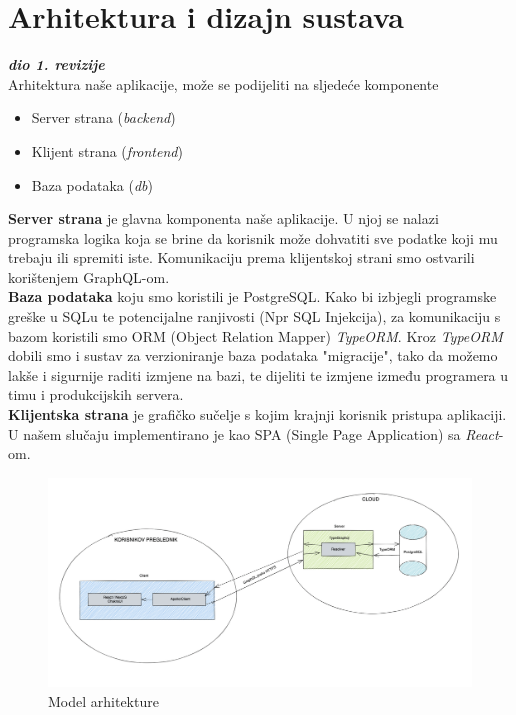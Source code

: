 \chapter{Arhitektura i dizajn sustava}
		
		\textbf{\textit{dio 1. revizije}}\\

		Arhitektura naše aplikacije, može se podijeliti na sljedeće komponente
	\begin{itemize}
		\item 	Server strana (\textit{backend})
		\item 	Klijent strana (\textit{frontend})
		\item 	Baza podataka (\textit{db})		
	\end{itemize}
	\textbf{Server strana} je glavna komponenta naše aplikacije. U njoj se nalazi programska logika koja se brine da korisnik može dohvatiti sve podatke koji mu trebaju ili spremiti iste. Komunikaciju prema klijentskoj strani smo ostvarili korištenjem GraphQL-om. \\
	\textbf{Baza podataka} koju smo koristili je PostgreSQL. Kako bi izbjegli programske greške u SQLu te potencijalne ranjivosti (Npr SQL Injekcija), za komunikaciju s bazom koristili smo ORM (Object Relation Mapper) \textit{TypeORM}. Kroz \textit{TypeORM} dobili smo i sustav za verzioniranje baza podataka "migracije", tako da možemo lakše i sigurnije raditi izmjene na bazi, te dijeliti te izmjene između programera u timu i produkcijskih servera. \\
	\textbf{Klijentska strana} je grafičko sučelje s kojim krajnji korisnik pristupa aplikaciji. U našem slučaju implementirano je kao SPA (Single Page Application) sa \textit{React}-om. \\
	
	\begin{figure}[H]
		\includegraphics[width=\textwidth]{slike/arhitekturaDijagram.png} 
		\caption{Model arhitekture}
		\label{fig:arhitektura} 
	\end{figure}

